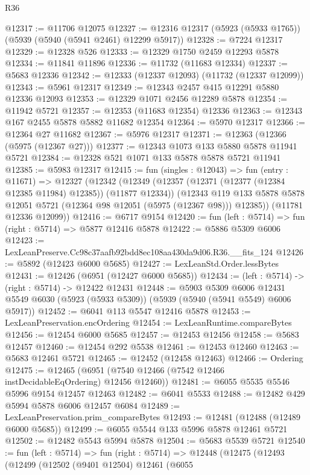 \begin{lexlean}{R36}
\begin{coremodule}
@12317 := @11706 @12075
@12327 := @12316 @12317 (@5923 (@5933 @1765)) (@5939 (@5940 (@5941 @2461) @12299 @5917))
@12328 := @7224 @12317
@12329 := @12328 @526
@12333 := @12329 @1750 @2459 @12293 @5878
@12334 := @11841 @11896
@12336 := @11732 (@11683 @12334)
@12337 := @5683 @12336
@12342 := @12333 (@12337 @12093) (@11732 (@12337 @12099))
@12343 := @5961 @12317
@12349 := @12343 @2457 @415 @12291 @5880 @12336 @12093
@12353 := @12329 @1071 @2456 @12289 @5878
@12354 := @11942 @5721
@12357 := @12353 (@11683 @12354) @12336
@12363 := @12343 @167 @2455 @5878 @5882 @11682 @12354
@12364 := @5970 @12317
@12366 := @12364 @27 @11682
@12367 := @5976 @12317
@12371 := @12363 (@12366 (@5975 (@12367 @27)))
@12377 := @12343 @1073 @133 @5880 @5878 @11941 @5721
@12384 := @12328 @521 @1071 @133 @5878 @5878 @5721 @11941
@12385 := @5983 @12317
@12415 := fun (singles : @12043) =>
  fun (entry : @11671) =>
  @12327
    (@12342
      (@12349
        (@12357 (@12371 (@12377 (@12384 @12385 @11984) @12385)) (@11877 @12334))
        (@12343 @119 @133 @5878 @5878 @12051 @5721 (@12364 @98 @12051 (@5975 (@12367 @98))) @12385))
      (@11781 @12336 @12099))
@12416 := @6717 @9154
@12420 := fun (left : @5714) => fun (right : @5714) => @5877 @12416 @5878
@12422 := @5886 @5309 @6006
@12423 := LexLeanPreserve.Cc98c37aafb92bdd8ec108aa430da9d06.R36.__fits_124
@12426 := @5892 (@12423 @6000 @5685)
@12427 := LexLeanStd.Order.lessBytes
@12431 := @12426 (@6951 (@12427 @6000 @5685))
@12434 := (left : @5714) -> (right : @5714) -> @12422 @12431
@12448 := @5903
    @5309
    @6006
    @12431
    @5549
    @6030
    (@5923 (@5933 @5309))
    (@5939 (@5940 (@5941 @5549) @6006 @5917))
@12452 := @6041 @113 @5547 @12416 @5878
@12453 := LexLeanPreservation.encOrdering
@12454 := LexLeanRuntime.compareBytes
@12456 := @12454 @6000 @5685
@12457 := @12453 @12456
@12458 := @5683 @12457
@12460 := @12454 @292 @5538
@12461 := @12453 @12460
@12463 := @5683 @12461 @5721
@12465 := @12452 (@12458 @12463)
@12466 := Ordering
@12475 := @12465 (@6951 (@7540 @12466 (@7542 @12466 instDecidableEqOrdering) @12456 @12460))
@12481 := @6055 @5535 @5546 @5996 @9154 @12457 @12463
@12482 := @6041 @5533
@12488 := @12482 @429 @5994 @5878 @6006 @12457 @6084
@12489 := LexLeanPreservation.prim_compareBytes
@12493 := @12481 (@12488 (@12489 @6000 @5685))
@12499 := @6055 @5544 @133 @5996 @5878 @12461 @5721
@12502 := @12482 @5543 @5994 @5878
@12504 := @5683 @5539 @5721
@12540 := fun (left : @5714) =>
  fun (right : @5714) =>
  @12448
    (@12475
      (@12493
        (@12499
          (@12502
            (@9401 @12504)
            @12461
            (@6055

\end{coremodule}
\end{lexlean}
